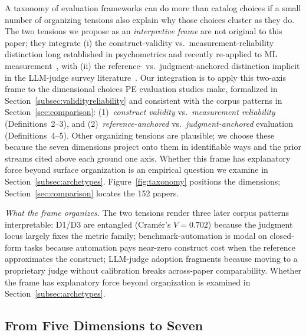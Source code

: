 \documentclass[acmsmall, nonacm, screen]{acmart}
\begin{document}
A taxonomy of evaluation frameworks can do more than catalog choices
if a small number of organizing tensions also explain why those
choices cluster as they do. The two tensions we propose as an
\emph{interpretive frame} are not original to this paper; they
integrate (i) the construct-validity vs.\ measurement-reliability
distinction long established in psychometrics
\cite{cronbach1955construct, messick1995validity} and recently
re-applied to ML measurement~\cite{jacobs2021measurement,
bean2025measuring, ye2025psychometrics}, with (ii) the
reference- vs.\ judgment-anchored distinction implicit in the
LLM-judge survey literature~\cite{gu2025llmjudge, li2025generationjudgment}.
Our integration is to apply this two-axis frame to the dimensional
choices PE evaluation studies make, formalized in
Section~\ref{subsec:validityreliability} and consistent with the corpus
patterns in Section~\ref{sec:comparison}:
(1)~\textit{construct validity} vs.\ \textit{measurement reliability}
(Definitions~2--3), and
(2)~\textit{reference-anchored} vs.\ \textit{judgment-anchored}
evaluation (Definitions~4--5). Other organizing tensions are
plausible; we choose these because the seven dimensions project onto
them in identifiable ways and the prior streams cited above each
ground one axis. Whether this frame has explanatory force
beyond surface organization is an empirical question we examine in
Section~\ref{subsec:archetypes}. Figure~\ref{fig:taxonomy} positions
the dimensions; Section~\ref{sec:comparison} locates the 152 papers.

\textit{What the frame organizes.} The two tensions render three
later corpus patterns interpretable: D1/D3 are entangled (Cram\'er's
$V = 0.702$) because the judgment locus largely fixes the metric
family; benchmark-automation is modal on closed-form tasks because
automation pays near-zero construct cost when the reference
approximates the construct; LLM-judge adoption fragments because
moving to a proprietary judge without calibration breaks
across-paper comparability. Whether the frame has explanatory force
beyond organization is examined in
Section~\ref{subsec:archetypes}.

\subsection{From Five Dimensions to Seven}
\label{subsec:fivetoseven}
\end{document}

